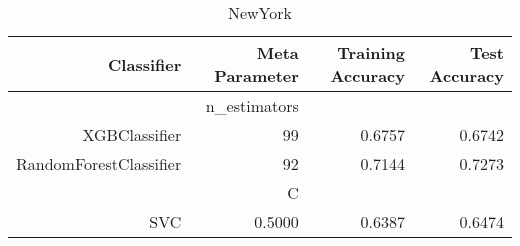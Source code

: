 
\begin{table}[H]
    \caption{NewYork}
    \centering
    \begin{tabular}{|r|r|r|r|}
        \hline
        Classifier &Meta Parameter &Training Accuracy
        &Test Accuracy\\
        \hline
        &n\_estimators &\multicolumn{2}{|r|}{}\\
        \hline
        XGBClassifier &99 &0.6757 &0.6742\\
        \hline
        RandomForestClassifier &92 &0.7144 &0.7273\\
        \hline
        &C &\multicolumn{2}{|r|}{}\\
        \hline
        SVC &0.5000 &0.6387 &0.6474\\
        \hline
    \end{tabular}
\end{table}
